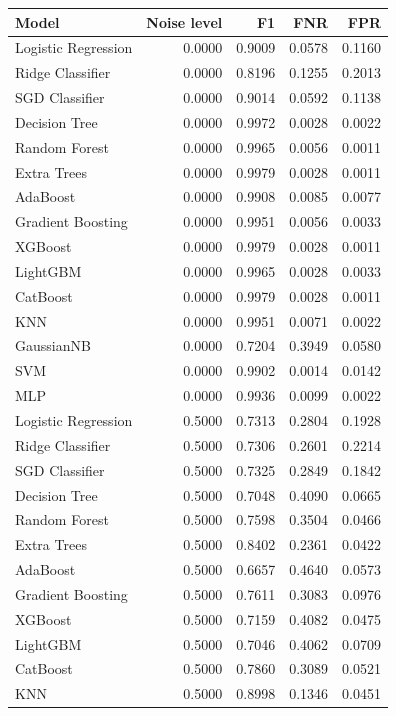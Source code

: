 \begin{tabular}{lrrrr}
\toprule
Model & Noise level & F1 & FNR & FPR \\
\midrule
Logistic Regression & 0.0000 & 0.9009 & 0.0578 & 0.1160 \\
Ridge Classifier & 0.0000 & 0.8196 & 0.1255 & 0.2013 \\
SGD Classifier & 0.0000 & 0.9014 & 0.0592 & 0.1138 \\
Decision Tree & 0.0000 & 0.9972 & 0.0028 & 0.0022 \\
Random Forest & 0.0000 & 0.9965 & 0.0056 & 0.0011 \\
Extra Trees & 0.0000 & 0.9979 & 0.0028 & 0.0011 \\
AdaBoost & 0.0000 & 0.9908 & 0.0085 & 0.0077 \\
Gradient Boosting & 0.0000 & 0.9951 & 0.0056 & 0.0033 \\
XGBoost & 0.0000 & 0.9979 & 0.0028 & 0.0011 \\
LightGBM & 0.0000 & 0.9965 & 0.0028 & 0.0033 \\
CatBoost & 0.0000 & 0.9979 & 0.0028 & 0.0011 \\
KNN & 0.0000 & 0.9951 & 0.0071 & 0.0022 \\
GaussianNB & 0.0000 & 0.7204 & 0.3949 & 0.0580 \\
SVM & 0.0000 & 0.9902 & 0.0014 & 0.0142 \\
MLP & 0.0000 & 0.9936 & 0.0099 & 0.0022 \\
Logistic Regression & 0.5000 & 0.7313 & 0.2804 & 0.1928 \\
Ridge Classifier & 0.5000 & 0.7306 & 0.2601 & 0.2214 \\
SGD Classifier & 0.5000 & 0.7325 & 0.2849 & 0.1842 \\
Decision Tree & 0.5000 & 0.7048 & 0.4090 & 0.0665 \\
Random Forest & 0.5000 & 0.7598 & 0.3504 & 0.0466 \\
Extra Trees & 0.5000 & 0.8402 & 0.2361 & 0.0422 \\
AdaBoost & 0.5000 & 0.6657 & 0.4640 & 0.0573 \\
Gradient Boosting & 0.5000 & 0.7611 & 0.3083 & 0.0976 \\
XGBoost & 0.5000 & 0.7159 & 0.4082 & 0.0475 \\
LightGBM & 0.5000 & 0.7046 & 0.4062 & 0.0709 \\
CatBoost & 0.5000 & 0.7860 & 0.3089 & 0.0521 \\
KNN & 0.5000 & 0.8998 & 0.1346 & 0.0451 \\

\end{tabular}

